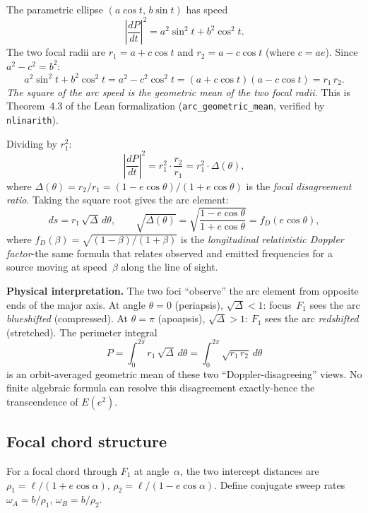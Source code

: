 \documentclass[12pt]{article}
\begin{document}
The parametric ellipse $(a\cos t,\, b\sin t)$ has speed
\[
\left|\frac{dP}{dt}\right|^2 = a^2\sin^2 t + b^2\cos^2 t.
\]
The two focal radii are $r_1 = a + c\cos t$ and $r_2 = a - c\cos t$ (where $c = ae$). Since $a^2 - c^2 = b^2$:
\begin{equation}\label{eq:gm}
a^2\sin^2 t + b^2\cos^2 t = a^2 - c^2\cos^2 t = (a + c\cos t)(a - c\cos t) = r_1\,r_2.
\end{equation}
\emph{The square of the arc speed is the geometric mean of the two focal radii.} This is Theorem~4.3 of the Lean formalization (\texttt{arc\_geometric\_mean}, verified by \texttt{nlinarith}).

Dividing by $r_1^2$:
\begin{equation}\label{eq:doppler}
\left|\frac{dP}{dt}\right|^2 = r_1^2 \cdot \frac{r_2}{r_1} = r_1^2 \cdot \Delta(\theta),
\end{equation}
where $\Delta(\theta) = r_2/r_1 = (1 - e\cos\theta)/(1 + e\cos\theta)$ is the \emph{focal disagreement ratio}. Taking the square root gives the arc element:
\begin{equation}\label{eq:ds}
ds = r_1\,\sqrt{\Delta}\,d\theta, \qquad
\sqrt{\Delta(\theta)} = \sqrt{\frac{1-e\cos\theta}{1+e\cos\theta}} = f_D(e\cos\theta),
\end{equation}
where $f_D(\beta) = \sqrt{(1-\beta)/(1+\beta)}$ is the \emph{longitudinal relativistic Doppler factor}-the same formula that relates observed and emitted frequencies for a source moving at speed~$\beta$ along the line of sight.

\medskip\noindent\textbf{Physical interpretation.}
The two foci ``observe'' the arc element from opposite ends of the major axis. At angle $\theta = 0$ (periapsis), $\sqrt{\Delta} < 1$: focus~$F_1$ sees the arc \emph{blueshifted} (compressed). At $\theta = \pi$ (apoapsis), $\sqrt{\Delta} > 1$: $F_1$ sees the arc \emph{redshifted} (stretched). The perimeter integral
\[
P = \int_0^{2\pi} r_1\,\sqrt{\Delta}\,d\theta = \int_0^{2\pi} \sqrt{r_1\,r_2}\,d\theta
\]
is an orbit-averaged geometric mean of these two ``Doppler-disagreeing'' views. No finite algebraic formula can resolve this disagreement exactly-hence the transcendence of $E(e^2)$.

\subsection{Focal chord structure}

For a focal chord through $F_1$ at angle~$\alpha$, the two intercept distances are $\rho_1 = \ell/(1+e\cos\alpha)$, $\rho_2 = \ell/(1-e\cos\alpha)$. Define conjugate sweep rates $\omega_A = b/\rho_1$, $\omega_B = b/\rho_2$.
\end{document}
